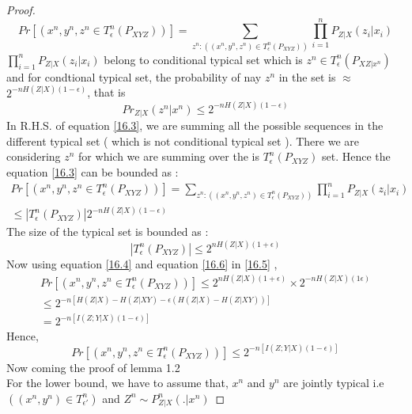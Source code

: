 \documentclass{article}
\begin{document}
\begin{proof}
\begin{equation}
	Pr \left[ \left( x^n,y^n,z^n \in T^{n}_{\epsilon} \left(  P_{XYZ} \right)\right)\right] = \sum_{z^{n} : \left( (x^n,y^n,z^n )\in T^{n}_{\epsilon} \left(  P_{XYZ} \right) \right) } \prod_{i = 1}^{n} P_{Z|X} \left( z_{i}|x_{i}\right) \label{16.3}
\end{equation}
$\prod_{i = 1}^{n} P_{Z|X} \left( z_{i}|x_{i}\right)$ belong to conditional typical set which is $z^{n} \in T^{n}_{\epsilon} \left( P_{XZ|x^n}\right)$ and for condtional typical set, the probability of nay $z^n$ in the set is $\approx$ $2^{-nH(Z|X) (1- \epsilon)}$, that is
\begin{equation}
	Pr_{Z|X}\left( z^n | x^n \right) \leq  2^{-nH(Z|X) (1 -\epsilon)} \label{16.4}
\end{equation}
In R.H.S. of equation \eqref{16.3}, we are summing all the possible sequences in the different typical set ( which is not conditional typical set ). There we are considering $z^n$ for which we are summing over the is   $T^{n}_{\epsilon} \left(  P_{XYZ} \right) $ set. Hence the equation \eqref{16.3} can be bounded as :
\begin{multline}
Pr \left[ \left( x^n,y^n,z^n \in T^{n}_{\epsilon} \left(  P_{XYZ} \right)\right)\right] = \sum_{z^{n} : \left( (x^n,y^n,z^n )\in T^{n}_{\epsilon} \left(  P_{XYZ} \right) \right) } \prod_{i = 1}^{n} P_{Z|X} \left( z_{i}|x_{i}\right) \\ \leq  |T^{n}_{\epsilon} \left(  P_{XYZ} \right) |2^{-nH(Z|X) (1 -\epsilon)}\label{16.5}
\end{multline}
The size of the typical set is bounded as :
\begin{equation}
	|T^{n}_{\epsilon} \left(  P_{XYZ} \right) | \leq  2^{nH(Z|X) (1 +\epsilon)} \label{16.6}
\end{equation}
Now using equation \eqref{16.4} and equation \eqref{16.6} in \eqref{16.5} ,
\begin{align*}
	Pr \left[ \left( x^n,y^n,z^n \in T^{n}_{\epsilon} \left(  P_{XYZ} \right)\right)\right] \leq  2^{nH(Z|X) (1 +\epsilon)} \times  2^{-nH(Z|X) (1 \epsilon)}\\ \leq 2^{ -n \left[ H(Z|X) - H(Z|XY) - \epsilon \left( H(Z|X) - H(Z|XY) \right)\right]} \\ = 2^{ -n \left[I\left( Z ; Y|X\right)(1-\epsilon)\right]}
\end{align*}
Hence,
\begin{equation}
Pr \left[ \left( x^n,y^n,z^n \in T^{n}_{\epsilon} \left(  P_{XYZ} \right)\right)\right] \leq 2^{ -n \left[I\left( Z ; Y|X\right)(1-\epsilon)\right]}
\end{equation}
Now coming the proof of lemma 1.2 \\
 For the lower bound, we have to assume that, $x^n$ and $y^n$  are jointly typical i.e $\left( (x^n,y^n) \in T^{n}_{\epsilon'}\right)$ and $Z^n \sim P^{n}_{Z|X}\left( .|x^n\right)$
 

\end{proof}
\end{document}
